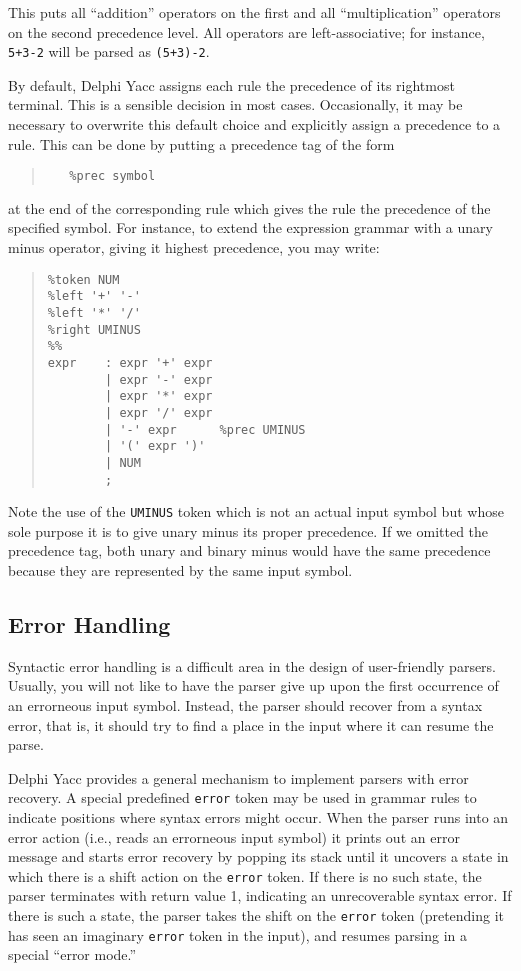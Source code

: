 \documentclass{article}
\begin{document}
This puts all ``addition'' operators on the first and all ``multiplication''
operators on the second precedence level. All operators are left-associative;
for instance, \verb"5+3-2" will be parsed as \verb"(5+3)-2".

By default, Delphi Yacc assigns each rule the precedence of its rightmost
terminal. This is a sensible decision in most cases. Occasionally, it
may be necessary to overwrite this default choice and explicitly assign
a precedence to a rule. This can be done by putting a precedence tag
of the form
\begin{quote}\begin{verbatim}
   %prec symbol
\end{verbatim}\end{quote}
at the end of the corresponding rule which gives the rule the precedence
of the specified symbol. For instance, to extend the expression grammar
with a unary minus operator, giving it highest precedence, you may write:

\begin{quote}\begin{verbatim}
%token NUM
%left '+' '-'
%left '*' '/'
%right UMINUS
%%
expr    : expr '+' expr
        | expr '-' expr
        | expr '*' expr
        | expr '/' expr
        | '-' expr      %prec UMINUS
        | '(' expr ')'
        | NUM
        ;
\end{verbatim}\end{quote}

Note the use of the \verb"UMINUS" token which is not an actual input symbol
but whose sole purpose it is to give unary minus its proper precedence. If
we omitted the precedence tag, both unary and binary minus would have the
same precedence because they are represented by the same input symbol.

\subsection{Error Handling}

Syntactic error handling is a difficult area in the design of user-friendly
parsers. Usually, you will not like to have the parser give up upon the
first occurrence of an errorneous input symbol. Instead, the parser should
recover from a syntax error, that is, it should try to find a place in the
input where it can resume the parse.

Delphi Yacc provides a general mechanism to implement parsers with error
recovery. A special predefined \verb"error" token may be used in grammar rules
to indicate positions where syntax errors might occur. When the parser runs
into an error action (i.e., reads an errorneous input symbol) it prints out
an error message and starts error recovery by popping its stack until it
uncovers a state in which there is a shift action on the \verb"error" token.
If there is no such state, the parser terminates with return value 1,
indicating an unrecoverable syntax error. If there is such a state, the
parser takes the shift on the \verb"error" token (pretending it has seen
an imaginary \verb"error" token in the input), and resumes parsing in a
special ``error mode.''
\end{document}
